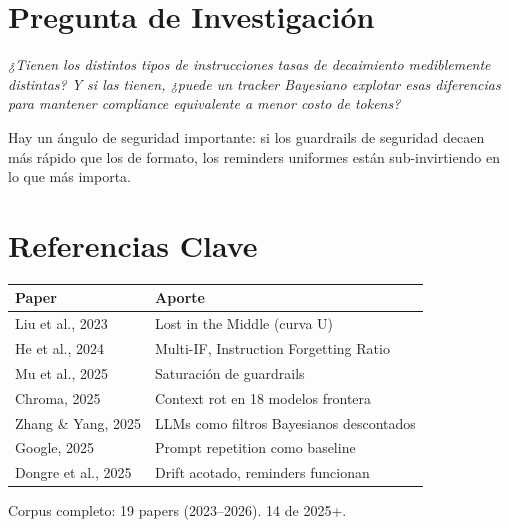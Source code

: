 \documentclass[11pt]{article}
\begin{document}
\section{Pregunta de Investigaci\'on}

\emph{¿Tienen los distintos tipos de instrucciones tasas de decaimiento mediblemente distintas? Y si las tienen, ¿puede un tracker Bayesiano explotar esas diferencias para mantener compliance equivalente a menor costo de tokens?}

\vspace{0.5em}
Hay un \'angulo de seguridad importante: si los guardrails de seguridad decaen m\'as r\'apido que los de formato, los reminders uniformes est\'an sub-invirtiendo en lo que m\'as importa.

\section{Referencias Clave}

{\centering
\begin{tabular}{@{} l l @{}}
\toprule
\textbf{Paper} & \textbf{Aporte} \\
\midrule
Liu et al., 2023 & Lost in the Middle (curva U) \\
He et al., 2024 & Multi-IF, Instruction Forgetting Ratio \\
Mu et al., 2025 & Saturaci\'on de guardrails \\
Chroma, 2025 & Context rot en 18 modelos frontera \\
Zhang \& Yang, 2025 & LLMs como filtros Bayesianos descontados \\
Google, 2025 & Prompt repetition como baseline \\
Dongre et al., 2025 & Drift acotado, reminders funcionan \\
\bottomrule
\end{tabular}\par}

Corpus completo: 19 papers (2023--2026). 14 de 2025+.
\end{document}

